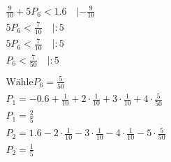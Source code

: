 \begin{align*}
    \frac{9}{10} + 5P_6 < 1.6 \quad | -\frac{9}{10}                                                       \\
    5P_6 < \frac{7}{10} \quad | : 5                                                                       \\
    5P_6 < \frac{7}{10} \quad | : 5                                                                       \\
    P_6 < \frac{7}{50} \quad | : 5                                                                        \\\\
    \text{Wähle} P_6 = \frac{5}{50}                                                                       \\
    P_1 = -0.6 + \frac{1}{10} + 2 \cdot \frac{1}{10} + 3 \cdot \frac{1}{10} + 4 \cdot \frac{5}{50}        \\
    P_1 = \frac{2}{5}                                                                                     \\
    P_2 = 1.6 - 2 \cdot \frac{1}{10} - 3 \cdot \frac{1}{10} - 4 \cdot \frac{1}{10} - 5 \cdot \frac{5}{50} \\
    P_2 = \frac{1}{5}
\end{align*}